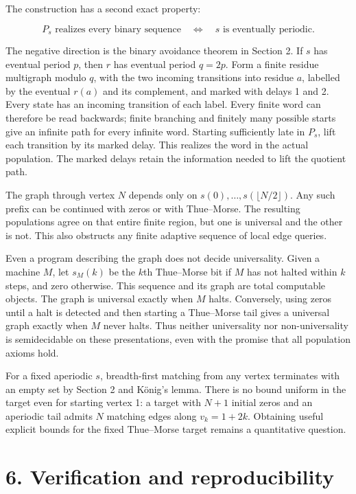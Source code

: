 \documentclass[
  11pt,
]{article}
\begin{document}
The construction has a second exact property:

\[P_s\text{ realizes every binary sequence}
\quad\Longleftrightarrow\quad s\text{ is eventually periodic}.\]

The negative direction is the binary avoidance theorem in Section 2. If
\(s\) has eventual period \(p\), then \(r\) has eventual period
\(q=2p\). Form a finite residue multigraph modulo \(q\), with the two
incoming transitions into residue \(a\), labelled by the eventual
\(r(a)\) and its complement, and marked with delays 1 and 2. Every state
has an incoming transition of each label. Every finite word can
therefore be read backwards; finite branching and finitely many possible
starts give an infinite path for every infinite word. Starting
sufficiently late in \(P_s\), lift each transition by its marked delay.
This realizes the word in the actual population. The marked delays
retain the information needed to lift the quotient path.

The graph through vertex \(N\) depends only on
\(s(0),\ldots,s(\lfloor N/2\rfloor)\). Any such prefix can be continued
with zeros or with Thue--Morse. The resulting populations agree on that
entire finite region, but one is universal and the other is not. This
also obstructs any finite adaptive sequence of local edge queries.

Even a program describing the graph does not decide universality. Given
a machine \(M\), let \(s_M(k)\) be the \(k\)th Thue--Morse bit if \(M\)
has not halted within \(k\) steps, and zero otherwise. This sequence and
its graph are total computable objects. The graph is universal exactly
when \(M\) halts. Conversely, using zeros until a halt is detected and
then starting a Thue--Morse tail gives a universal graph exactly when
\(M\) never halts. Thus neither universality nor non-universality is
semidecidable on these presentations, even with the promise that all
population axioms hold.

For a fixed aperiodic \(s\), breadth-first matching from any vertex
terminates with an empty set by Section 2 and König's lemma. There is no
bound uniform in the target even for starting vertex 1: a target with
\(N+1\) initial zeros and an aperiodic tail admits \(N\) matching edges
along \(v_k=1+2k\). Obtaining useful explicit bounds for the fixed
Thue--Morse target remains a quantitative question.

\section{6. Verification and
reproducibility}\label{verification-and-reproducibility}
\end{document}
